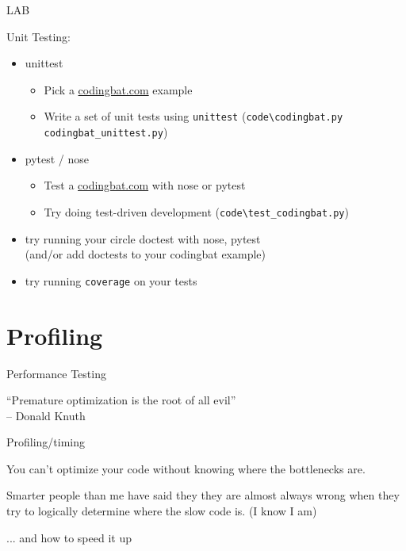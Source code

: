 \documentclass{beamer}
\begin{document}
\begin{frame}[fragile]{LAB}

{\Large Unit Testing:}

\begin{itemize}
  \item unittest
    \begin{itemize}
       \item Pick a \url{codingbat.com} example
       \item Write a set of unit tests using \verb|unittest|
         (\verb|code\codingbat.py  codingbat_unittest.py|)
    \end{itemize}
  \item pytest / nose
    \begin{itemize}
       \item Test a \url{codingbat.com} with nose or pytest
       \item Try doing test-driven development
         (\verb|code\test_codingbat.py|)
    \end{itemize}

  \item try running your circle doctest with nose, pytest\\
        (and/or add doctests to your codingbat example)
  \item try running \verb|coverage| on your tests
\end{itemize}

\end{frame}

\section{Profiling}

\begin{frame}[fragile]{Performance Testing}

{\Large ``Premature optimization is the root of all evil''}\\[0.1in]
{\large \hspace{0.5in} -- Donald Knuth}

\end{frame} 

\begin{frame}[fragile]{Profiling/timing}

\vfill
{\Large You can't optimize your code without knowing where the bottlenecks are.}

\vfill
{\Large Smarter people than me have said they they are almost always wrong
when they try to logically determine where the slow code is. (I know I am)}

\vfill
{\Large ... and how to speed it up}

\end{frame} 
\end{document}
